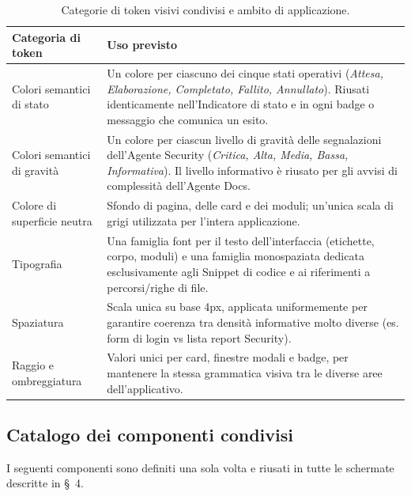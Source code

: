 \documentclass[11pt,a4paper]{article}
\begin{document}
\begin{table}[H]
\centering
\caption{Categorie di token visivi condivisi e ambito di applicazione.}
\label{tab:fe-token}
\vspace{2mm}
\renewcommand{\arraystretch}{1.2}
\begin{tabularx}{\textwidth}{|l|X|}
\hline
\textbf{Categoria di token} & \textbf{Uso previsto} \\ \hline
Colori semantici di stato & Un colore per ciascuno dei cinque stati operativi (\emph{Attesa, Elaborazione, Completato, Fallito, Annullato}). Riusati identicamente nell'Indicatore di stato e in ogni badge o messaggio che comunica un esito. \\ \hline
Colori semantici di gravità & Un colore per ciascun livello di gravità delle segnalazioni dell'Agente Security (\emph{Critica, Alta, Media, Bassa, Informativa}). Il livello informativo è riusato per gli avvisi di complessità dell'Agente Docs. \\ \hline
Colore di superficie neutra & Sfondo di pagina, delle card e dei moduli; un'unica scala di grigi utilizzata per l'intera applicazione. \\ \hline
Tipografia & Una famiglia font per il testo dell'interfaccia (etichette, corpo, moduli) e una famiglia monospaziata dedicata esclusivamente agli Snippet di codice e ai riferimenti a percorsi/righe di file. \\ \hline
Spaziatura & Scala unica su base 4px, applicata uniformemente per garantire coerenza tra densità informative molto diverse (es. form di login vs lista report Security). \\ \hline
Raggio e ombreggiatura & Valori unici per card, finestre modali e badge, per mantenere la stessa grammatica visiva tra le diverse aree dell'applicativo. \\ \hline
\end{tabularx}
\end{table}

\subsection{Catalogo dei componenti condivisi}

I seguenti componenti sono definiti una sola volta e riusati in tutte le schermate descritte in \S~4.
\end{document}
